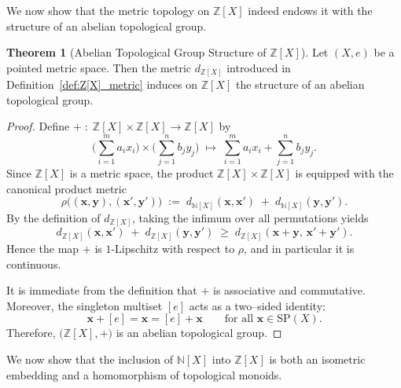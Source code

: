\documentclass[10pt,a4paper]{article}
\theoremstyle{definition}
\newtheorem{theorem}{Theorem}[section]
\newcommand{\SP}{\mathrm{SP}}
\newcommand{\Z}{\mathbb{Z}}
\newcommand{\N}{\mathbb{N}}
\begin{document}
We now show that the metric topology on $\Z[X]$ indeed endows it with the
structure of an abelian topological group.


\begin{theorem}[Abelian Topological Group Structure of {$\Z[X]$}]
\label{thm:Z[X]_topology_equivalence}
Let $(X,e)$ be a pointed metric space.  
Then the metric $d_{\Z[X]}$ introduced in
Definition~\ref{def:Z[X]_metric} induces on $\Z[X]$ the structure of an abelian topological group.
\end{theorem}


\begin{proof}

Define $+\;:\; \Z[X] \times \Z[X] \longrightarrow \Z[X]$ by
    \[
    \big(\sum_{i=1}^{m} a_i x_i\big) \times \big(\sum_{j=1}^{n} b_j y_j\big)
    \;\longmapsto\;
    \sum_{i=1}^{m} a_i x_i + \sum_{j=1}^{n} b_j y_j.
    \]
    Since $\Z[X]$ is a metric space, the product $\Z[X] \times \Z[X]$ is
    equipped with the canonical product metric
    \[
    \rho\bigl((\mathbf{x},\mathbf{y}),(\mathbf{x}',\mathbf{y}')\bigr)
    \;:=\;
    d_{\N[X]}(\mathbf{x},\mathbf{x}') \;+\; d_{\N[X]}(\mathbf{y},\mathbf{y}').
    \]
    By the definition of $d_{\Z[X]}$, taking the infimum over all permutations yields
    \[
    d_{\Z[X]}(\mathbf{x},\mathbf{x}')
    \;+\;
    d_{\Z[X]}(\mathbf{y},\mathbf{y}')
    \;\geq\;
    d_{\Z[X]}(\mathbf{x}+\mathbf{y},\,\mathbf{x}'+\mathbf{y}').
    \]
    Hence the map $+$ is $1$-Lipschitz with respect to $\rho$, and in particular
    it is continuous. 

    It is immediate from the definition that $+$ is associative and commutative.
    Moreover, the singleton multiset $[e]$ acts as a two--sided identity:
    \[
    \mathbf{x} + [e] = \mathbf{x} = [e] + \mathbf{x}
    \qquad
    \text{for all } \mathbf{x} \in \SP(X).
    \]
    Therefore, $\bigl(\Z[X],+\bigr)$ is an abelian topological group.

\end{proof}

We now show that the inclusion of $\N[X]$ into $\Z[X]$ is both an isometric
embedding and a homomorphism of topological monoids.
\end{document}
